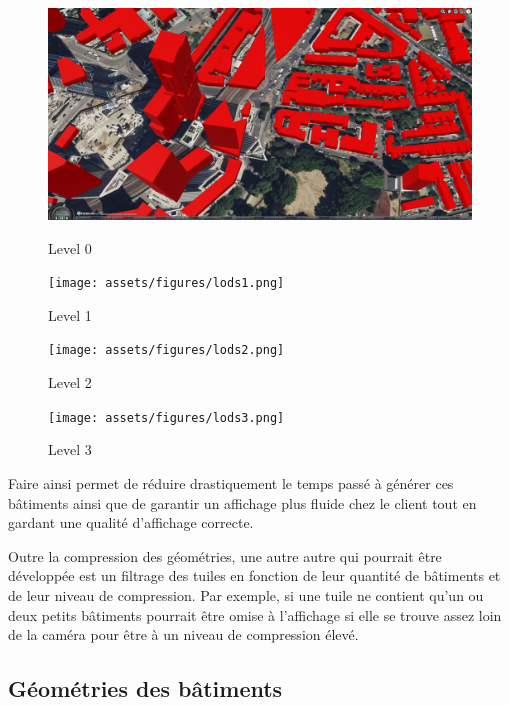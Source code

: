 \begin{figure}[H]
    \centering
    \begin{minipage}{0.49\textwidth}
        \centering
        \includegraphics[width=\textwidth]{assets/figures/lods0.png}
        \caption{Level 0}
        \label{fig:lods0}
    \end{minipage}\hfill
    \begin{minipage}{0.49\textwidth}
        \centering
        \texttt{[image: assets/figures/lods1.png]}
        \caption{Level 1}
        \label{fig:lods1}
    \end{minipage}
    \vspace{1cm}
    \begin{minipage}{0.49\textwidth}
        \centering
        \texttt{[image: assets/figures/lods2.png]}
        \caption{Level 2}
        \label{fig:lods2}
    \end{minipage}\hfill
    \begin{minipage}{0.49\textwidth}
        \centering
        \texttt{[image: assets/figures/lods3.png]}
        \caption{Level 3}
        \label{fig:lods3}
    \end{minipage}
\end{figure}


Faire ainsi permet de réduire drastiquement le temps passé à générer ces bâtiments ainsi que de garantir un affichage plus fluide chez le client tout en gardant une qualité d'affichage correcte.

Outre la compression des géométries, une autre autre qui pourrait être développée est un filtrage des tuiles en fonction de leur quantité de bâtiments et de leur niveau de compression. Par exemple, si une tuile ne contient qu'un ou deux petits bâtiments pourrait être omise à l'affichage si elle se trouve assez loin de la caméra pour être à un niveau de compression élevé.

\subsection{Géométries des bâtiments}

